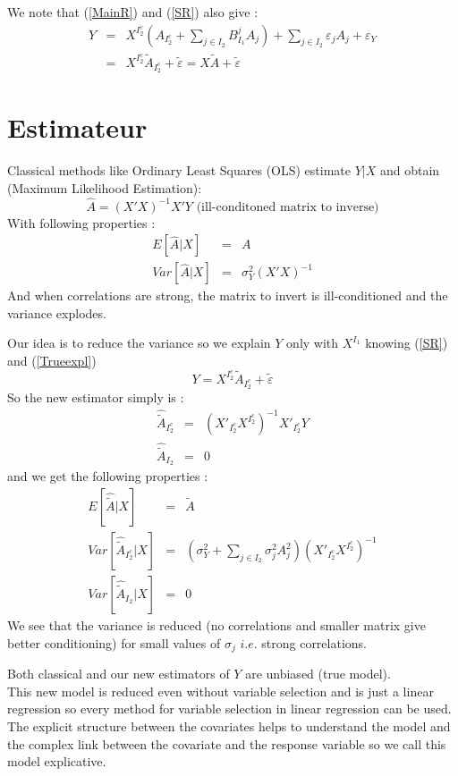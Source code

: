 \documentclass[12pt]{article}
\begin{document}
We note that (\ref{MainR}) and (\ref{SR}) also give :
\begin{eqnarray}
	Y&=&X^{I_2^c} (A_{I_2^c}+ \sum_{j \in I_2}B^{j}_{I_1}A_{j})+  \sum_{j \in I_2}\varepsilon_{j}A_{j}+\varepsilon_Y \\
					&=& X^{I_2^c}\tilde{A}_{I_2^c}+ \tilde{\varepsilon}=X\tilde{A}+ \tilde{\varepsilon}\label{Trueexpl} 			
\end{eqnarray}
\section{Estimateur}
	Classical methods like Ordinary Least Squares (OLS) estimate $Y|X$ and obtain (Maximum Likelihood Estimation): 
		\begin{equation}
			\hat A = (X'X)^{-1}X'Y \textrm{ (ill-conditoned matrix to inverse)}
		\end{equation}
		With following properties :
		\begin{eqnarray}
			E[\hat{A}|X]&=&A \\
			Var[\hat{A}|X]&=& \sigma_Y^2(X'X)^{-1}
		\end{eqnarray}				
		And when correlations are strong, the matrix to invert is ill-conditioned and the variance explodes.
 			
		Our idea is to reduce the variance so we explain $Y$ only with $X^{I_1}$ knowing (\ref{SR}) and (\ref{Trueexpl})
			\begin{equation}
				Y= X^{I_2^c}\tilde{A}_{I_2^c}+ \tilde{\varepsilon}\label{explicatif}
			\end{equation}							
		So the new estimator simply is : 
		\begin{eqnarray}
			\hat{\tilde{A}}_{I_2^c} &=& (X'_{I_2^c} X^{I_2^c})^{-1}X'_{I_2^c}Y \\
			\hat{\tilde{A}}_{I_2} &=& 0
		\end{eqnarray}
		and we get the following properties :
		\begin{eqnarray}
			E[\hat{\tilde{A}}|X]&=&\tilde{A} \\
			Var[\hat{\tilde{A}}_{I_2^c}|X]&=& (\sigma^2_Y+\sum_{j \in I_2}\sigma^2_{j}A_{j}^2 )(X'_{I_2^c} X^{I_2^c})^{-1} \\
			Var[\hat{\tilde{A}}_{I_2}|X]&=& 0 
		\end{eqnarray}
		We see that the variance is reduced (no correlations and smaller matrix give better conditioning) for small values of $\sigma_j$ $i.e.$ strong correlations.					
		
		Both classical and our new estimators of $Y$ are unbiased (true model)\cite{saporta2006probabilites}.
	\\	
			This new model is reduced even without variable selection and is just a linear regression so every method for variable selection in linear regression can be used. 
		 \\				
			The explicit structure between the covariates helps to understand the model and the complex link between the covariate and the response variable so we call this model explicative.	
			
\end{document}
